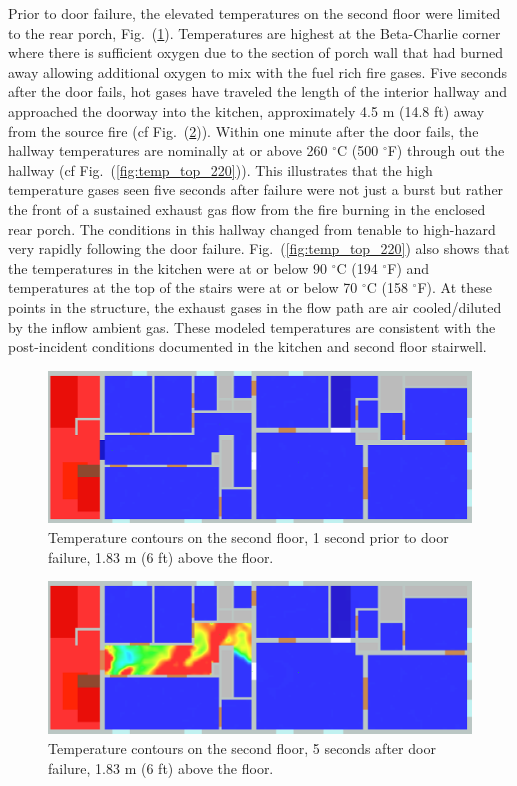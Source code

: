 \documentclass[11pt,oneside]{book}
\begin{document}
Prior to door failure, the elevated temperatures on the second floor were limited to the rear porch, Fig.~(\ref{fig:temp_top_159}). Temperatures are highest at the Beta-Charlie corner where there is sufficient oxygen due to the section of porch wall that had burned away allowing additional oxygen to mix with the fuel rich fire gases. Five seconds after the door fails, hot gases have traveled the length of the interior hallway and approached the doorway into the kitchen, approximately 4.5 m (14.8 ft) away from the source fire (cf Fig.~(\ref{fig:temp_top_165})). Within one minute after the door fails, the hallway temperatures are nominally at or above 260 $^{\circ}$C (500 $^{\circ}$F) through out the hallway (cf Fig.~(\ref{fig:temp_top_220})). This illustrates that the high temperature gases seen five seconds after failure were not just a burst but rather the front of a sustained exhaust gas flow from the fire burning in the enclosed rear porch. The conditions in this hallway changed from tenable to high-hazard very rapidly following the door failure. Fig.~(\ref{fig:temp_top_220}) also shows that the temperatures in the kitchen were at or below 90 $^{\circ}$C (194 $^{\circ}$F) and temperatures at the top of the stairs were at or below 70 $^{\circ}$C (158 $^{\circ}$F). At these points in the structure, the exhaust gases in the flow path are air cooled/diluted by the inflow ambient gas. These modeled temperatures are consistent with the post-incident conditions documented in the kitchen and second floor stairwell.
\begin{figure}[h!]
\centering
\includegraphics[width=.7\textwidth]{../Figures/west_50th_baseline_top_159_6ft}
 

\caption{Temperature contours on the second floor, 1 second prior to door failure, 1.83 m (6 ft) above the floor.}
\label{fig:temp_top_159}
\end{figure}

\begin{figure}[h!]
\centering
\includegraphics[width=.7\textwidth]{../Figures/west_50th_baseline_top_165_6ft}
 

\caption{Temperature contours on the second floor, 5 seconds after door failure, 1.83 m (6 ft) above the floor.}
\label{fig:temp_top_165}
\end{figure}
\end{document}

